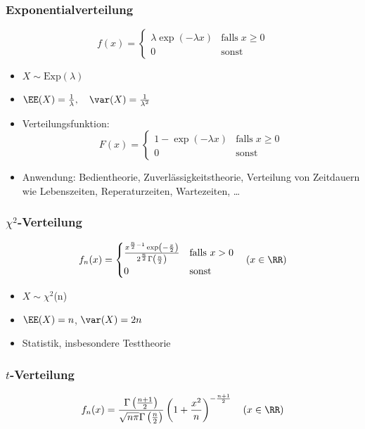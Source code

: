 \subsubsection{Exponentialverteilung}
$$f(x)=\begin{cases}
\lambda \exp(-\lambda x) & \mathrm{falls} \; x\geq 0\\
0 & \mathrm{sonst}
\end{cases}
$$
\begin{itemize}
\item $X\sim \mathrm{Exp}(\lambda)$
\item $\EE(X)=\frac{1}{\lambda}, \quad \var(X)=\frac{1}{\lambda^2}$
\item Verteilungsfunktion:
$$F(x)=\begin{cases}
1-\exp(-\lambda x) & \mathrm{falls}\; x \geq 0\\
0 & \mathrm{sonst}
\end{cases}$$
\item Anwendung: Bedientheorie, Zuverlässigkeitstheorie, Verteilung von Zeitdauern wie Lebenszeiten, Reperaturzeiten, Wartezeiten, …
\end{itemize}

\subsubsection{\texorpdfstring{$ \chi^2 $}{Chi-Quadrat}-Verteilung}

$$f_n(x)=\begin{cases}
\frac{x^{\frac{n}{2}-1}\exp\left(-\frac{x}{2}\right)}{2^{\frac{n}{2}}\Gamma\left(\frac{n}{2}\right)} & \text{falls }x>0\\
0 & \text{sonst}
\end{cases} \quad (x\in \RR)$$

\begin{itemize}
	\item $X\sim \chi^{2}$(n)
	\item $\EE(X)=n$, $\var(X)=2n$
	\item Statistik, insbesondere Testtheorie
\end{itemize}

\subsubsection{\texorpdfstring{$ t $}{t}-Verteilung}

\[ f_n(x)=\frac{\Gamma\left(\frac{n+1}{2}\right)}{\sqrt{n \pi}\Gamma\left(\frac{n}{2}\right)}\left(1+\frac{x^2}{n}\right)^{-\frac{n+1}{2}} \quad (x\in \RR) \]

